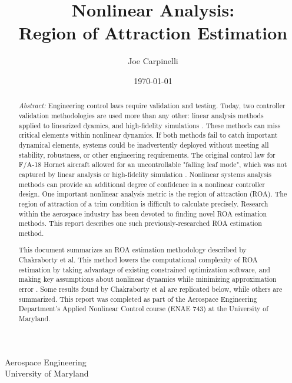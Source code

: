 \documentclass[%
 reprint,
 amsmath,amssymb,
 aps,
]{revtex4-2}
\begin{document}

\title{Nonlinear Analysis:\\Region of Attraction Estimation}%

\author{Joe Carpinelli}
 \affiliation
 {Aerospace Engineering\\University of Maryland}
 
\date{\today}

\begin{abstract}
\textit{Abstract:} Engineering control laws require validation and testing. Today, two controller validation methodologies are used more than any other: linear analysis methods applied to linearized dyamics, and high-fidelity simulations \cite{primary}. These methods can miss critical elements within nonlinear dynamics. If both methods fail to catch important dynamical elements, systems could be inadvertently deployed without meeting all stability, robustness, or other engineering requirements. The original control law for F/A-18 Hornet aircraft allowed for an uncontrollable "falling leaf mode", which was not captured by linear analysis or high-fidelity simulation \cite{leaf}\cite{primary}. Nonlinear systems analysis methods can provide an additional degree of confidence in a nonlinear controller design. One important nonlinear analysis metric is the region of attraction (ROA). The region of attraction of a trim condition is difficult to calculate precisely. Research within the aerospace industry has been devoted to finding novel ROA estimation methods. This report describes one such previously-researched ROA estimation method.

This document summarizes an ROA estimation methodology described by Chakraborty et al. This method lowers the computational complexity of ROA estimation by taking advantage of existing constrained optimization software, and making key assumptions about nonlinear dynamics while minimizing approximation error \cite{primary}. Some results found by Chakraborty et al are replicated below, while others are summarized. This report was completed as part of the Aerospace Engineering Department's Applied Nonlinear Control course (ENAE 743) at the University of Maryland.

\end{abstract}

\maketitle

\tableofcontents
\end{document}
